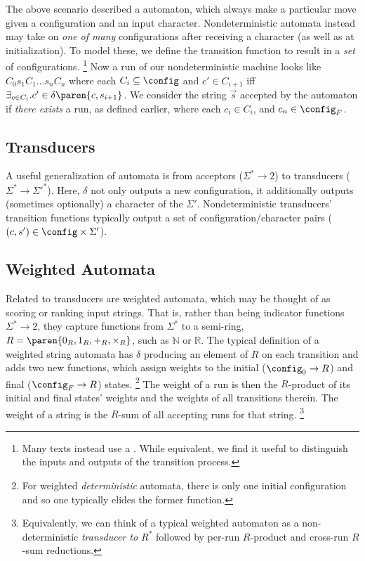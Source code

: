The above scenario described a  automaton, which always
make a particular move given a configuration and an input character.
Nondeterministic automata instead may take on {\em one of many}
configurations after receiving a character (as well as at initialization).
To model these, we define the transition function to result in a {\em set}
of configurations.%
%
\footnote{Many texts instead use a .  While
equivalent, we find it useful to distinguish the inputs and outputs of the
transition process.}
%
Now a run of our nondeterministic machine looks like $C_0 s_1 C_1 \ldots s_n
C_n$ where each $C_i \subseteq \config$ and $c' \in C_{i+1}$ iff
$\exists_{c \in C_i} . c' \in \delta\paren{c,s_{i+1}}$.  We consider the
string $\vec{s}$ accepted by the automaton if {\em there exists} a run, as
defined earlier, where each $c_i \in C_i$, and $c_n \in \config_F$.

\subsection{Transducers}

A useful generalization of automata is from acceptors ($\Sigma^* \to 2$) to
transducers ($\Sigma^* \to \Sigma'^*$).  Here, $\delta$ not only outputs a
new configuration, it additionally outputs (sometimes optionally) a
character of the  $\Sigma'$.  Nondeterministic
transducers' transition functions typically output a set of
configuration/character pairs ($(c, s') \in \config \times \Sigma'$).

\subsection{Weighted Automata}

Related to transducers are weighted automata, which may be thought of as
scoring or ranking input strings.  That is, rather than being indicator
functions $\Sigma^* \to 2$, they capture functions from $\Sigma^*$ to a
semi-ring, $R = \paren{0_R, 1_R, +_R, \times_R}$, such as $\mathbb{N}$ or
$\mathbb{R}$.  The typical definition of a weighted string automata has
$\delta$ producing an element of $R$ on each transition and adds two new
functions, which assign weights to the initial ($\config_0 \to R$) and
final ($\config_F \to R$) states.%
%
\footnote{For weighted {\em deterministic} automata, there is only one
initial configuration and so one typically elides the former function.}
%
The weight of a run is then the
$R$-product of its initial and final states' weights and the weights of all
transitions therein.  The weight of a string is the $R$-sum of all accepting
runs for that string.%
%
\footnote{Equivalently, we can think of a typical weighted automaton as a
non-deterministic {\em transducer to $R^*$} followed by per-run $R$-product
and cross-run $R$-sum reductions.}

